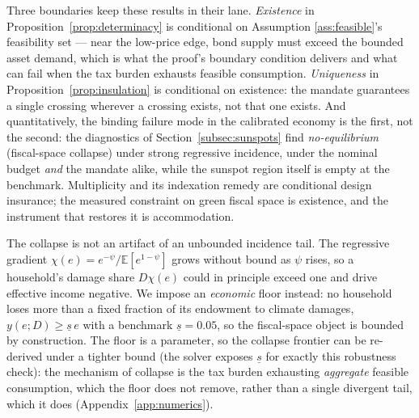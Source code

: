 \documentclass[12pt]{article}
\newcommand{\E}{\mathbb{E}}
\begin{document}
Three boundaries keep these results in their lane. \emph{Existence} in
Proposition~\ref{prop:determinacy} is conditional on Assumption
\ref{ass:feasible}'s feasibility set --- near the low-price edge, bond
supply must exceed the bounded asset demand, which is what the proof's
boundary condition delivers and what can fail when the tax burden exhausts
feasible consumption. \emph{Uniqueness} in
Proposition~\ref{prop:insulation} is conditional on existence: the mandate
guarantees a single crossing wherever a crossing exists, not that one
exists. And quantitatively, the binding failure mode in the calibrated
economy is the first, not the second: the diagnostics of
Section~\ref{subsec:sunspots} find \emph{no-equilibrium} (fiscal-space
collapse) under strong regressive incidence, under the nominal budget
\emph{and} the mandate alike, while the sunspot region itself is empty at
the benchmark. Multiplicity and its indexation remedy are conditional
design insurance; the measured constraint on green fiscal space is
existence, and the instrument that restores it is accommodation.

The collapse is not an artifact of an unbounded incidence tail. The
regressive gradient $\chi(e)=e^{-\psi}/\E[e^{1-\psi}]$ grows without bound as
$\psi$ rises, so a household's damage share $D\chi(e)$ could in principle
exceed one and drive effective income negative. We impose an \emph{economic}
floor instead: no household loses more than a fixed fraction of its endowment
to climate damages, $y(e;D)\ge \underline{s}\,e$ with a benchmark
$\underline{s}=0.05$, so the fiscal-space object is bounded by construction.
The floor is a parameter, so the collapse frontier can be re-derived under a
tighter bound (the solver exposes $\underline{s}$ for exactly this
robustness check): the mechanism of collapse is the tax burden exhausting
\emph{aggregate} feasible consumption, which the floor does not remove, rather
than a single divergent tail, which it does (Appendix~\ref{app:numerics}).
\end{document}

